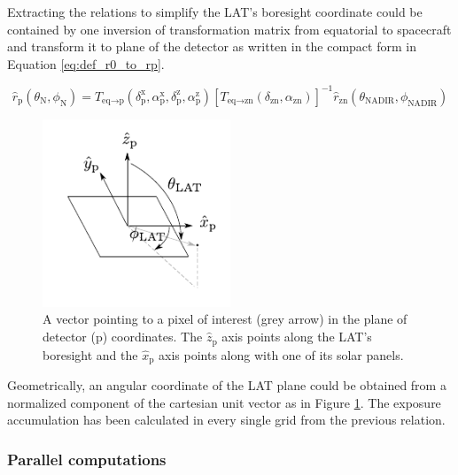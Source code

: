Extracting the relations to simplify the 
LAT's boresight coordinate could be contained by one inversion of 
transformation matrix from equatorial to spacecraft and transform it 
to plane of the detector as written in the compact form in Equation 
\ref{eq:def_r0_to_rp}.

\begin{equation}
    \hat{r}_\text{p} (\theta_\text{N}, \phi_\text{N}) = T_{\text{eq}\rightarrow\text{p}} (\delta^\text{x}_\text{p}, \alpha^\text{x}_\text{p}, \delta^\text{z}_\text{p}, \alpha^\text{z}_\text{p}) \left[T_{\text{eq}\rightarrow\text{zn}} (\delta_\text{zn}, \alpha_\text{zn})\right]^{-1} \hat{r}_\text{zn} (\theta_\text{NADIR}, \phi_\text{NADIR})
    \label{eq:def_r0_to_rp}
\end{equation}

\begin{figure}[h!]
    \centering
    \includegraphics[width=0.5\textwidth]{content/methodology/figures/fig_coordinate/coord_plane_v2.pdf}
    \caption{
        A vector pointing to a pixel of interest (grey arrow)
        in the plane of detector (p) coordinates.
        The $\hat{z}_\text{p}$ axis
        points along the LAT's boresight
        and the $\hat{x}_\text{p}$ axis
        points along with one of its solar panels.
    }
    \label{fig:tf_lat_pol_car}
\end{figure}

Geometrically, an angular coordinate of the LAT plane could be obtained from
a normalized component of the cartesian unit vector as in Figure
\ref{fig:tf_lat_pol_car}. The exposure accumulation has been
calculated in every single grid from the previous relation.

\subsubsection{Parallel computations}

